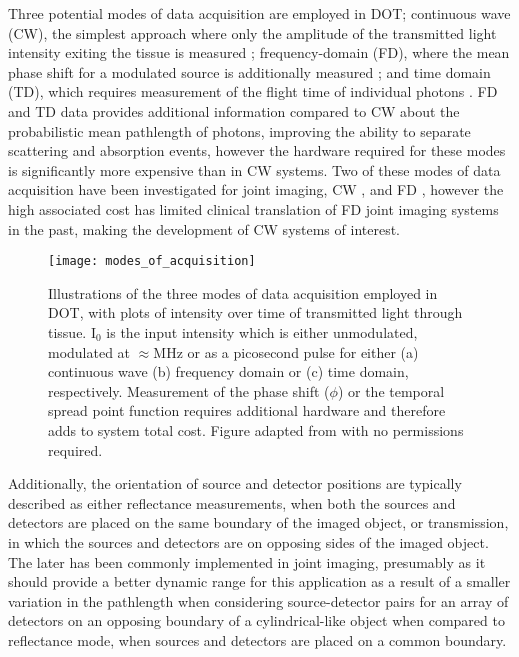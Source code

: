 \documentclass[twoside]{bhamthesis}
\theoremstyle{definition}
\begin{document}
Three potential modes of data acquisition are employed in DOT; continuous wave (CW), the simplest approach where only the amplitude of the transmitted light intensity exiting the tissue is measured \cite{xu2001imaging}; frequency-domain (FD), where the mean phase shift for a modulated source is additionally measured \cite{hielscher2011frequency}; and  time domain (TD), which requires measurement of the flight time of individual photons \cite{hebden2001three}. FD and TD data provides additional information compared to CW about the probabilistic mean pathlength of photons, improving the ability to separate scattering and absorption events, however the hardware required for these modes is significantly more expensive than in CW systems.  Two of these modes of data acquisition have been investigated for joint imaging, CW \cite{lighter2018multispectral,scheel2002assessment,schwaighofer2003classification},  and FD \cite{hielscher2011frequency,montejo2013computer2}, however the high associated cost has limited clinical translation of FD joint imaging systems in the past, making the development of CW systems of interest.

\begin{figure}[!ht]
  \centering
  \texttt{[image: modes\_of\_acquisition]}
\caption{Illustrations of the three modes of data acquisition employed in DOT, with plots of intensity over time of transmitted light through tissue. $\mathrm{I_0}$ is the input intensity which is either unmodulated, modulated at $\approx$MHz or as a picosecond pulse for either (a) continuous wave (b) frequency domain or (c) time domain, respectively. Measurement of the phase shift ($\phi$) or the temporal spread point function requires additional hardware and therefore adds to system total cost. Figure adapted from \cite{rupawala2018shining} with no permissions required.}
\end{figure}

Additionally, the orientation of source and detector positions are typically described as either reflectance measurements, when both the sources and detectors are placed on the same boundary of the imaged object, or transmission, in which the sources and detectors are on opposing sides of the imaged object. The later has been commonly implemented in joint imaging, presumably as it should provide a better dynamic range for this application as a result of a smaller variation in the pathlength when considering source-detector pairs for an array of detectors on an opposing boundary of a cylindrical-like object when compared to reflectance mode, when sources and detectors are placed on a common boundary.
\end{document}

